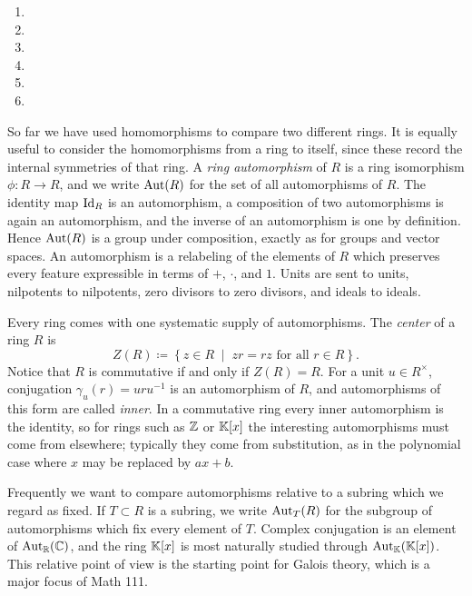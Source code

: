 \documentclass[Notebook.tex]{subfiles}
\begin{document}
\begin{solution}
	\bbni
	\begin{enumerate}[label=(\alph*),ref=\theenumi\alph*]
		\item
		\item
		\item
		\item
		\item
		\item
	\end{enumerate}
\end{solution}

\newpage

So far we have used homomorphisms to compare two different rings. It is equally useful to consider the homomorphisms from a ring to itself, since these record the internal symmetries of that ring. A \emph{ring automorphism} of $R$ is a ring isomorphism $\phi:R\to R$, and we write $\operatorname{Aut}(R)$ for the set of all automorphisms of $R$. The identity map $\operatorname{Id}_R$ is an automorphism, a composition of two automorphisms is again an automorphism, and the inverse of an automorphism is one by definition. Hence $\operatorname{Aut}(R)$ is a group under composition, exactly as for groups and vector spaces. An automorphism is a relabeling of the elements of $R$ which preserves every feature expressible in terms of $+$, $\cdot$, and $1$. Units are sent to units, nilpotents to nilpotents, zero divisors to zero divisors, and ideals to ideals.

Every ring comes with one systematic supply of automorphisms. The \emph{center} of a ring $R$ is
\[
Z(R)\coloneqq\left\{z\in R \;\; \big| \;\; zr=rz \text{ for all } r\in R\right\}.
\]
Notice that $R$ is commutative if and only if $Z(R)=R$. For a unit $u\in R^\times$, conjugation $\gamma_u(r)=uru^{-1}$ is an automorphism of $R$, and automorphisms of this form are called \emph{inner}. In a commutative ring every inner automorphism is the identity, so for rings such as $\mathbb Z$ or $\mathbb K[x]$ the interesting automorphisms must come from elsewhere; typically they come from substitution, as in the polynomial case where $x$ may be replaced by $ax+b$.

Frequently we want to compare automorphisms relative to a subring which we regard as fixed. If $T\subset R$ is a subring, we write $\operatorname{Aut}_T(R)$ for the subgroup of automorphisms which fix every element of $T$. Complex conjugation is an element of $\operatorname{Aut}_\mathbb R(\mathbb C)$, and the ring $\mathbb K[x]$ is most naturally studied through $\operatorname{Aut}_\mathbb K(\mathbb K[x])$. This relative point of view is the starting point for Galois theory, which is a major focus of Math 111.
\end{document}
